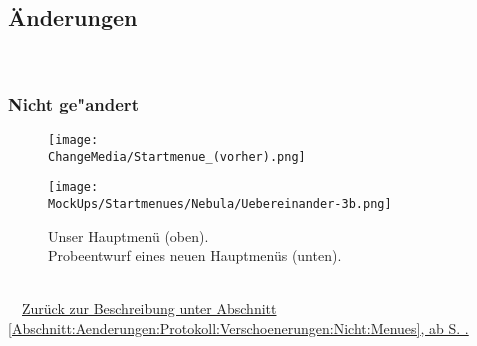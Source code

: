 %



\newpage





\subsection*{Änderungen}

~\\


\subsubsection*{Nicht ge{"a}ndert}
\label{Abschnitt:Anhang:Aenderungen:Nicht}


	\begin{figure}[ht]
	
		\label{Abb:Aenderungen:Startmenue}
		\centering

		\texttt{[image: \\ChangeMedia/Startmenue\_(vorher).png]}
		
	\end{figure}
	

	\begin{figure}[ht]
	
		\label{Abb:Aenderungen:Startmenue_(nachher)}
		\centering

		\texttt{[image: \\MockUps/Startmenues/Nebula/Uebereinander-3b.png]}
		
		\caption{Unser Hauptmenü (oben).\\Probeentwurf eines neuen Hauptmenüs (unten).}

	\end{figure}
	
~\\~\mousecursor~\hyperref[Abschnitt:Aenderungen:Protokoll:Verschoenerungen:Nicht:Menues]{Zurück zur Beschreibung unter Abschnitt \ref{Abschnitt:Aenderungen:Protokoll:Verschoenerungen:Nicht:Menues}, ab S. \pageref{Abschnitt:Aenderungen:Protokoll:Verschoenerungen:Nicht:Menues}.}
